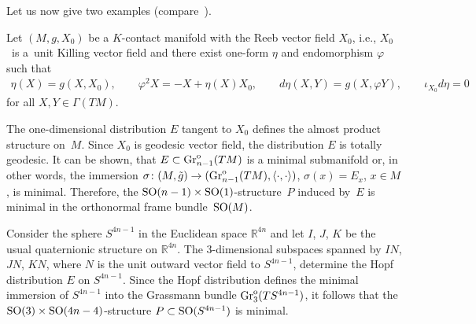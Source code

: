 \documentclass[pdftex]{sigma}
\numberwithin{equation}{section}
\newcommand{\skal}[2]{\langle #1,#2\rangle}
\begin{document}
Let us now give two examples (compare~\cite{ggv,gd,hl}).

\begin{Example}
Let $(M,g,X_0)$ be a $K$-contact manifold with the Reeb vector f\/ield $X_0$, i.e., $X_0$~is a~unit Killing vector f\/ield and there exist one-form $\eta$ and endomorphism $\varphi$ such that
\begin{gather*}
\eta(X)=g(X,X_0),\qquad \varphi^2X=-X+\eta(X)X_0,\qquad d\eta(X,Y)=g(X,\varphi Y),\qquad \iota_{X_0}d\eta=0
\end{gather*}
for all $X,Y\in\Gamma(TM)$.

The one-dimensional distribution $E$ tangent to $X_0$ def\/ines the almost product structure on~$M$. Since $X_0$ is geodesic vector f\/ield, the distribution $E$ is totally geodesic. It can be shown, that $E\subset \operatorname{Gr}^{\rm o}_{n-1}(TM)$ is a minimal submanifold or, in other words, the immersion $\sigma\colon (M,\tilde{g})\to (\operatorname{Gr}^{\rm o}_{n-1}(TM),\skal{\cdot}{\cdot})$, $\sigma(x)=E_x$, $x\in M$, is minimal. Therefore, the ${\rm SO}(n-1)\times {\rm SO}(1)$-structure~$P$ induced by~$E$ is minimal in the orthonormal frame bundle~${\rm SO}(M)$.
\end{Example}

\begin{Example}
Consider the sphere $S^{4n-1}$ in the Euclidean space $\mathbb{R}^{4n}$ and let $I$, $J$, $K$ be the usual quaternionic structure on $\mathbb{R}^{4n}$. The $3$-dimensional subspaces spanned by $IN$, $JN$, $KN$, where $N$ is the unit outward vector f\/ield to $S^{4n-1}$, determine the Hopf distribution $E$ on $S^{4n-1}$. Since the Hopf distribution def\/ines the minimal immersion of $S^{4n-1}$ into the Grassmann bundle $\operatorname{Gr}^{\rm o}_3(TS^{4n-1})$, it follows that the ${\rm SO}(3)\times {\rm SO}(4n-4)$-structure $P\subset {\rm SO}(S^{4n-1})$ is minimal.
\end{Example}

\vspace{-2mm}
\end{document}
